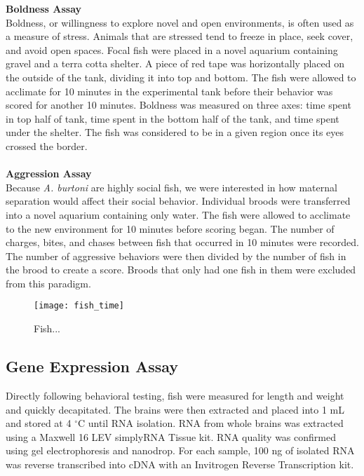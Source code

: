 \documentclass[12pt,twoside]{reedthesis}
\begin{document}
\noindent\textbf{Boldness Assay}\\
Boldness, or willingness to explore novel and open environments, is often used
as a measure of stress. Animals that are stressed tend to freeze in place, seek
cover, and avoid open spaces. Focal fish were placed in a novel aquarium
containing gravel and a terra cotta shelter. A piece of red tape was
horizontally placed on the outside of the tank, dividing it into top and bottom.
The fish were allowed to acclimate for
10 minutes in the experimental tank before their behavior was scored for another 10 minutes. Boldness was
measured on three axes: time spent in top half of tank, time spent in the
bottom half of the tank, and time spent under the shelter. The fish was
considered to be in a given region once its eyes crossed the border.\\
\\
\noindent\textbf{Aggression Assay}\\
Because \textit{A. burtoni} are highly social fish, we were interested in how
maternal separation would affect their social behavior. Individual broods were
transferred into a novel aquarium containing only water. The fish were allowed
to acclimate to the new environment for 10 minutes before scoring began. The
number of charges, bites, and chases between fish that occurred in 10 minutes
were recorded. The number of aggressive behaviors were then divided by the number of fish in the brood to create a score. Broods that only had one fish in them were excluded from this paradigm.  

\begin{figure}[htbp] 
\begin{centering} 
\texttt{[image: fish\_time]}
\caption[Timeline of Experiment]{Fish...} 
\label{subd}
\end{centering} 
\end{figure}

\subsection{Gene Expression Assay}
Directly following behavioral testing, fish were measured for length and weight
and quickly decapitated. The brains were then extracted and placed into 1 mL and
stored at 4 $^\circ$C until RNA isolation. RNA from whole brains was extracted
using a Maxwell 16 LEV simplyRNA Tissue kit. RNA quality was confirmed using gel
electrophoresis and nanodrop. For each sample, 100 ng of isolated RNA was
reverse transcribed into cDNA with an Invitrogen Reverse Transcription kit.
\end{document}
